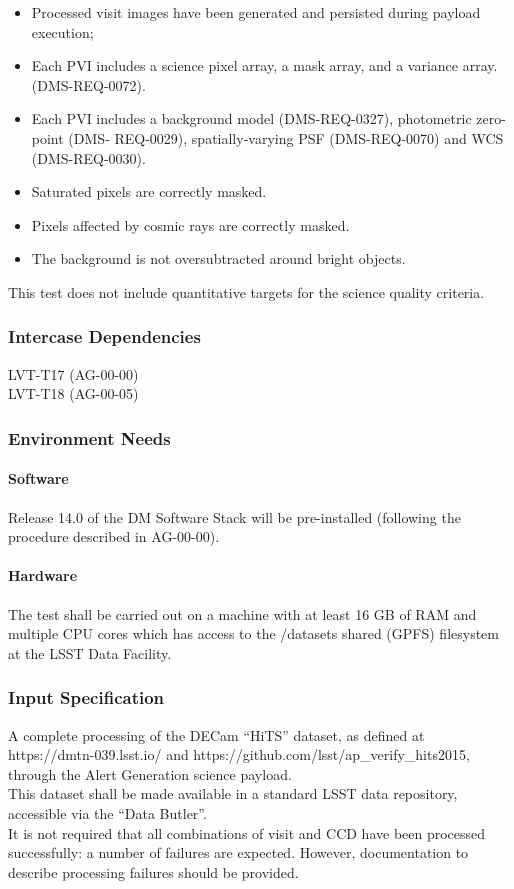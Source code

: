 \begin{itemize}
\tightlist
\item
  Processed visit images have been generated and persisted during
  payload execution;
\item
  Each PVI includes a science pixel array, a mask array, and a variance
  array. (DMS-REQ-0072).
\item
  Each PVI includes a background model (DMS-REQ-0327), photometric
  zero-point (DMS- REQ-0029), spatially-varying PSF (DMS-REQ-0070) and
  WCS (DMS-REQ-0030).
\item
  Saturated pixels are correctly masked.
\item
  Pixels affected by cosmic rays are correctly masked.
\item
  The background is not oversubtracted around bright objects.
\end{itemize}

This test does not include quantitative targets for the science quality
criteria.



\subsubsection{Intercase Dependencies}
LVT-T17 (AG-00-00)\\
LVT-T18 (AG-00-05)


\subsubsection{Environment Needs}

\paragraph{Software}
Release 14.0 of the DM Software Stack will be pre-installed (following
the procedure described in AG-00-00).


\paragraph{Hardware}
The test shall be carried out on a machine with at least 16 GB of RAM
and multiple CPU cores which has access to the /datasets shared (GPFS)
filesystem at the LSST Data Facility.


\subsubsection{Input Specification}
A complete processing of the DECam ``HiTS'' dataset, as defined at
https://dmtn-039.lsst.io/ and
https://github.com/lsst/ap\_verify\_hits2015, through the Alert
Generation science payload.\\
This dataset shall be made available in a standard LSST data repository,
accessible via the ``Data Butler''.\\
It is not required that all combinations of visit and CCD have been
processed successfully: a number of failures are expected. However,
documentation to describe processing failures should be provided.


